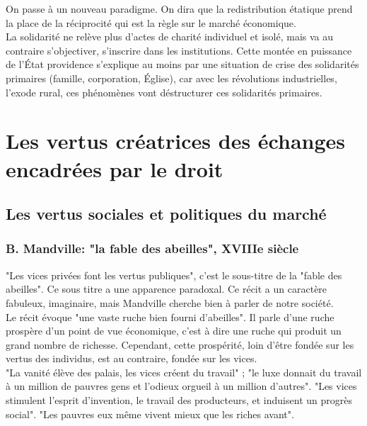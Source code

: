 \documentclass[10pt, a4paper, openany]{book}
\begin{document}
On passe à un nouveau paradigme. On dira que la redistribution étatique prend la place de la réciprocité qui est la règle sur le marché économique. \\
La solidarité ne relève plus d'actes de charité individuel et isolé, mais va au contraire s'objectiver, s'inscrire dans les institutions. Cette montée en puissance de l'État providence s'explique au moins par une situation de crise des solidarités primaires (famille, corporation, Église), car avec les révolutions industrielles, l'exode rural, ces phénomènes vont déstructurer ces solidarités primaires. 

\section{Les vertus créatrices des échanges encadrées par le droit}

\subsection{Les vertus sociales et politiques du marché}

\subsubsection{B. Mandville: "la fable des abeilles", XVIIIe siècle}

"Les vices privées font les vertus publiques", c'est le sous-titre de la "fable des abeilles". Ce sous titre a une apparence paradoxal. Ce récit a un caractère fabuleux, imaginaire, mais Mandville cherche bien à parler de notre société. \\
Le récit évoque "une vaste ruche bien fourni d'abeilles". Il parle d'une ruche prospère d'un point de vue économique, c'est à dire une ruche qui produit un grand nombre de richesse. Cependant, cette prospérité, loin d'être fondée sur les vertus des individus, est au contraire, fondée sur les vices. \\
"La vanité élève des palais, les vices créent du travail" ; "le luxe donnait du travail à un million de pauvres gens et l'odieux orgueil à un million d'autres". "Les vices stimulent l'esprit d'invention, le travail des producteurs, et induisent un progrès social". "Les pauvres eux même vivent mieux que les riches avant".  
\end{document}
